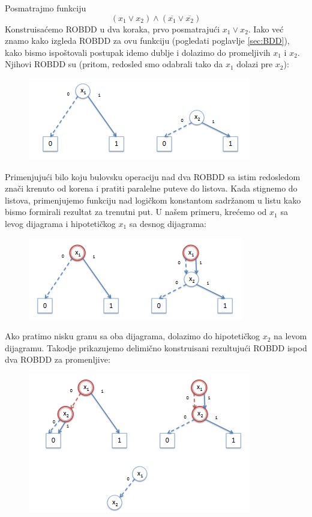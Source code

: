\begin{exmp}
    Posmatrajmo funkciju
    $$(x_{1} \vee x_{2}) \wedge (\overline{x_{1}} \vee \overline{x_{2}})$$
    Konstruisa\'c{}emo ROBDD u dva koraka, prvo posmatraju\'c{}i $x_{1} \vee x_{2}$. Iako ve\'c{} znamo kako izgleda ROBDD za ovu funkciju (pogledati poglavlje \ref{sec:BDD}), kako bismo ispo\v{s}tovali postupak idemo dublje i dolazimo do promeljivih $x_{1}$ i $x_{2}$. Njihovi ROBDD su (pritom, redosled smo odabrali tako da $x_{1}$ dolazi pre $x_{2}$):

    \begin{figure}[H]
        \centering
        \includegraphics{slike/ROBDD_primer_1.PNG}
    \end{figure}

    Primenjuju\'c{}i bilo koju bulovsku operaciju nad dva ROBDD sa istim redosledom zna\v{c}i krenuto od korena i pratiti paralelne puteve do listova. Kada stignemo do listova, primenjujemo funkciju nad logi\v{c}kom konstantom sadr\v{z}anom u listu kako bismo formirali rezultat za trenutni put. U na\v{s}em primeru, kre\'c{}emo od $x_{1}$ sa levog dijagrama i hipoteti\v{c}kog $x_{1}$ sa desnog dijagrama:

    \begin{figure}[H]
        \centering
        \includegraphics{slike/ROBDD_primer_2.PNG}
    \end{figure}

    Ako pratimo nisku granu sa oba dijagrama, dolazimo do hipoteti\v{c}kog $x_{2}$ na levom dijagramu. Takodje prikazujemo delimi\v{c}no konstruisani rezultuju\'c{}i ROBDD ispod dva ROBDD za promenljive:

    \begin{figure}[H]
        \centering
        \includegraphics{slike/ROBDD_primer_3.PNG}
    \end{figure}


\end{exmp}
